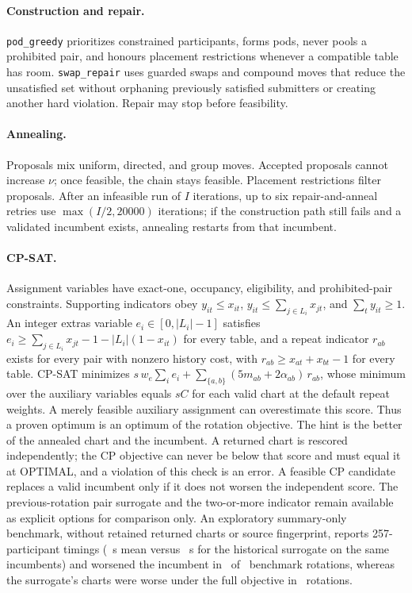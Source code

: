 \documentclass[11pt,a4paper]{article}
\begin{document}
\paragraph{Construction and repair.} \texttt{pod\_greedy} prioritizes constrained participants, forms pods, never pools a prohibited pair, and honours placement restrictions whenever a compatible table has room. \texttt{swap\_repair} uses guarded swaps and compound moves that reduce the unsatisfied set without orphaning previously satisfied submitters or creating another hard violation. Repair may stop before feasibility.
\paragraph{Annealing.} Proposals mix uniform, directed, and group moves. Accepted proposals cannot increase $\nu$; once feasible, the chain stays feasible. Placement restrictions filter proposals. After an infeasible run of $I$ iterations, up to six repair-and-anneal retries use $\max(I/2,20000)$ iterations; if the construction path still fails and a validated incumbent exists, annealing restarts from that incumbent.
\paragraph{CP-SAT.} Assignment variables have exact-one, occupancy, eligibility, and prohibited-pair constraints. Supporting indicators obey $y_{it}\le x_{it}$, $y_{it}\le\sum_{j\in L_i}x_{jt}$, and $\sum_t y_{it}\ge1$. An integer extras variable $e_i\in[0,|L_i|-1]$ satisfies $e_i\ge\sum_{j\in L_i}x_{jt}-1-|L_i|(1-x_{it})$ for every table, and a repeat indicator $r_{ab}$ exists for every pair with nonzero history cost, with $r_{ab}\ge x_{at}+x_{bt}-1$ for every table. CP-SAT minimizes $s\,w_e\sum_i e_i+\sum_{\{a,b\}}(5m_{ab}+2\alpha_{ab})\,r_{ab}$, whose minimum over the auxiliary variables equals $sC$ for each valid chart at the default repeat weights. A merely feasible auxiliary assignment can overestimate this score. Thus a proven optimum is an optimum of the rotation objective. The hint is the better of the annealed chart and the incumbent. A returned chart is rescored independently; the CP objective can never be below that score and must equal it at OPTIMAL, and a violation of this check is an error. A feasible CP candidate replaces a valid incumbent only if it does not worsen the independent score. The previous-rotation pair surrogate and the two-or-more indicator remain available as explicit options for comparison only. An exploratory summary-only benchmark, without retained returned charts or source fingerprint, reports 257-participant timings (\BenchExactMeanSeconds\ s mean versus \BenchSurrogateMeanSeconds\ s for the historical surrogate on the same incumbents) and worsened the incumbent in \BenchExactWorsened\ of \BenchRotations\ benchmark rotations, whereas the surrogate's charts were worse under the full objective in \BenchSurrogateWorsened\ rotations.
\end{document}
